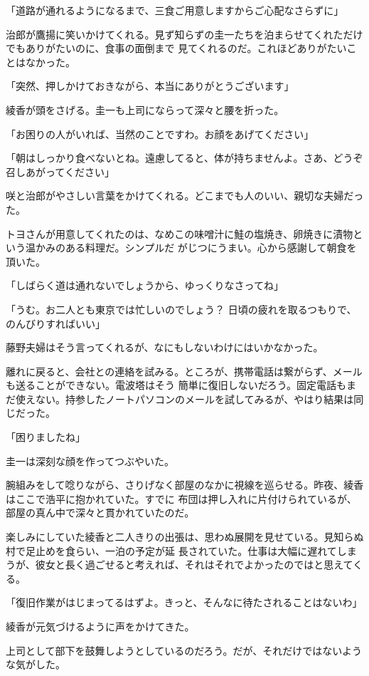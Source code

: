 ﻿\documentclass[book,tate]{jlreq}
\begin{document}
「道路が通れるようになるまで、三食ご用意しますからご心配なさらずに」

治郎が鷹揚に笑いかけてくれる。見ず知らずの圭一たちを泊まらせてくれただけでもありがたいのに、食事の面倒まで 見てくれるのだ。これほどありがたいことはなかった。

「突然、押しかけておきながら、本当にありがとうございます」

綾香が頭をさげる。圭一も上司にならって深々と腰を折った。

「お困りの人がいれば、当然のことですわ。お顔をあげてください」

「朝はしっかり食べないとね。遠慮してると、体が持ちませんよ。さあ、どうぞ召しあがってください」

咲と治郎がやさしい言葉をかけてくれる。どこまでも人のいい、親切な夫婦だった。

トヨさんが用意してくれたのは、なめこの味噌汁に鮭の塩焼き、卵焼きに漬物という温かみのある料理だ。シンプルだ がじつにうまい。心から感謝して朝食を頂いた。

「しばらく道は通れないでしょうから、ゆっくりなさってね」

「うむ。お二人とも東京では忙しいのでしょう？ 日頃の疲れを取るつもりで、のんびりすればいい」

藤野夫婦はそう言ってくれるが、なにもしないわけにはいかなかった。

離れに戻ると、会社との連絡を試みる。ところが、携帯電話は繋がらず、メールも送ることができない。電波塔はそう 簡単に復旧しないだろう。固定電話もまだ使えない。持参したノートパソコンのメールを試してみるが、やはり結果は同じだった。

「困りましたね」

圭一は深刻な顔を作ってつぶやいた。

腕組みをして唸りながら、さりげなく部屋のなかに視線を巡らせる。昨夜、綾香はここで浩平に抱かれていた。すでに 布団は押し入れに片付けられているが、部屋の真ん中で深々と貫かれていたのだ。

楽しみにしていた綾香と二人きりの出張は、思わぬ展開を見せている。見知らぬ村で足止めを食らい、一泊の予定が延 長されていた。仕事は大幅に遅れてしまうが、彼女と長く過ごせると考えれば、それはそれでよかったのではと思えてくる。

「復旧作業がはじまってるはずよ。きっと、そんなに待たされることはないわ」

綾香が元気づけるように声をかけてきた。

上司として部下を鼓舞しようとしているのだろう。だが、それだけではないような気がした。
\end{document}
